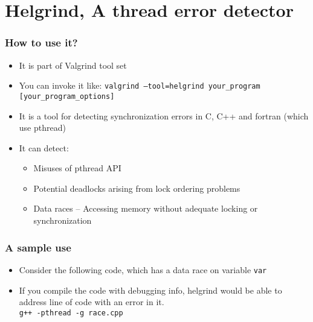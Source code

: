 \documentclass[aspectratio=43,11pt]{beamer}
\begin{document}
\section{Helgrind, A thread error detector}
\begin{frame}
  \sectionpage
\end{frame}
\begin{frame}
  \frametitle{How to use it?}

  \begin{itemize}
    \item It is part of Valgrind tool set
    \item You can invoke it like: {\tt valgrind --tool=helgrind your\_program [your\_program\_options]}
    \item It is a tool for detecting synchronization errors in C, C++ and fortran (which use pthread)
    \item It can detect:
    \begin{itemize}
      \item Misuses of pthread API
      \item Potential deadlocks arising from lock ordering problems
      \item Data races -- Accessing memory without adequate locking or synchronization
    \end{itemize}
  \end{itemize}

\let\thefootnote\relax{}
\end{frame}
\begin{frame}
  \frametitle{A sample use}
  
  \begin{itemize}
    \item Consider the following code, which has a data race on variable {\tt var}
    
    \item If you compile the code with debugging info, helgrind would be able to address line of code
    with an error in it. \\
    {\tt g++ -pthread -g race.cpp}
  \end{itemize}
  
  \let\thefootnote\relax{}
\end{frame}
\end{document}
